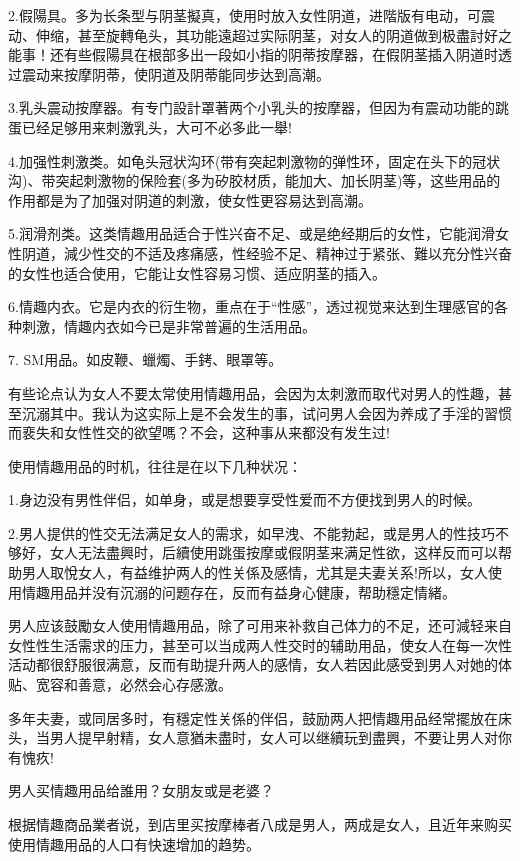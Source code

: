 \documentclass[12pt,UTF8]{ctexbook}
\begin{document}
2.假陽具。多为长条型与阴茎擬真，使用时放入女性阴道，进階版有电动，可震动、伸缩，甚至旋轉龟头，其功能遠超过实际阴茎，对女人的阴道做到极盡討好之能事！还有些假陽具在根部多出一段如小指的阴蒂按摩器，在假阴茎插入阴道时透过震动来按摩阴蒂，使阴道及阴蒂能同步达到高潮。

3.乳头震动按摩器。有专门設計罩著两个小乳头的按摩器，但因为有震动功能的跳蛋已经足够用来刺激乳头，大可不必多此一舉!

4.加强性刺激类。如龟头冠状沟环(带有突起刺激物的弹性环，固定在头下的冠状沟)、带突起刺激物的保险套(多为矽胶材质，能加大、加长阴茎)等，这些用品的作用都是为了加强对阴道的刺激，使女性更容易达到高潮。

5.润滑剂类。这类情趣用品适合于性兴奋不足、或是绝经期后的女性，它能润滑女性阴道，減少性交的不适及疼痛感，性经验不足、精神过于紧张、難以充分性兴奋的女性也适合使用，它能让女性容易习惯、适应阴茎的插入。

6.情趣内衣。它是内衣的衍生物，重点在于“性感”，透过视觉来达到生理感官的各种刺激，情趣内衣如今已是非常普遍的生活用品。

7. SM用品。如皮鞭、蠟燭、手銬、眼罩等。

有些论点认为女人不要太常使用情趣用品，会因为太刺激而取代对男人的性趣，甚至沉溺其中。我认为这实际上是不会发生的事，试问男人会因为养成了手淫的習惯而裵失和女性性交的欲望嗎？不会，这种事从来都没有发生过!

使用情趣用品的时机，往往是在以下几种状况：

1.身边没有男性伴侣，如单身，或是想要享受性爱而不方便找到男人的时候。

2.男人提供的性交无法满足女人的需求，如早洩、不能勃起，或是男人的性技巧不够好，女人无法盡興时，后續使用跳蛋按摩或假阴茎来满足性欲，这样反而可以帮助男人取悅女人，有益维护两人的性关係及感情，尤其是夫妻关系!所以，女人使用情趣用品并没有沉溺的问题存在，反而有益身心健康，帮助穩定情緒。

男人应该鼓勵女人使用情趣用品，除了可用来补救自己体力的不足，还可減轻来自女性性生活需求的压力，甚至可以当成两人性交时的辅助用品，使女人在每一次性活动都很舒服很满意，反而有助提升两人的感情，女人若因此感受到男人对她的体贴、宽容和善意，必然会心存感激。

多年夫妻，或同居多时，有穩定性关係的伴侣，鼓励两人把情趣用品经常擺放在床头，当男人提早射精，女人意猶未盡时，女人可以继續玩到盡興，不要让男人对你有愧疚!

男人买情趣用品给誰用？女朋友或是老婆？

根据情趣商品業者说，到店里买按摩棒者八成是男人，两成是女人，且近年来购买使用情趣用品的人口有快速增加的趋势。
\end{document}
